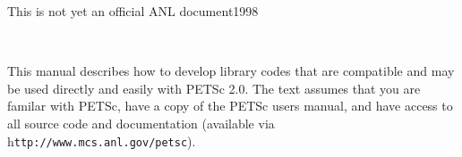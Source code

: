 %
%
%
\setlength{\textwidth}{6.5in}
\setlength{\oddsidemargin}{0.0in}
\setlength{\evensidemargin}{0.0in}
\setlength{\textheight}{9.2in}
\setlength{\topmargin}{-.8in}

\newcommand{\findex}[1]{\index{FUNCTION #1}}
\newcommand{\sindex}[1]{\index{#1}}
\newcommand{\F}{\mbox{\boldmath \(F\)}}
\newcommand{\x}{\mbox{\boldmath \(x\)}}
\newcommand{\rr}{\mbox{\boldmath \(r\)}}

\makeindex
 



{\Large This is not yet an official ANL document}{1998}

\newpage

\hbox{ }

\vspace{1in}
\date{\today}

\newpage


\medskip \medskip



%
%

\medskip \medskip
This manual describes how to develop library codes that are compatible
and may be used directly and easily with PETSc 2.0.  The text assumes
that you are familar with PETSc, have a copy of the PETSc users
manual, and have access to all source code and documentation
(available via h{\tt ttp://www.mcs.anl.gov/petsc}).

